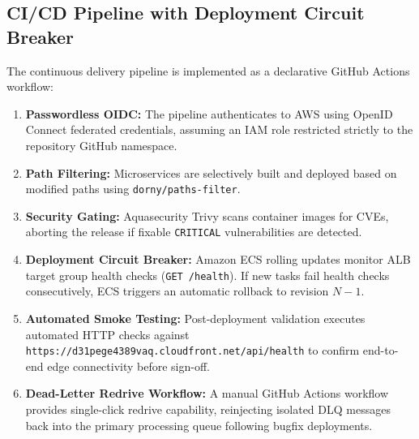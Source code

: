 \documentclass[conference]{IEEEtran}
\begin{document}
\subsection{CI/CD Pipeline with Deployment Circuit Breaker}
The continuous delivery pipeline is implemented as a declarative GitHub Actions workflow:
\begin{enumerate}
    \item \textbf{Passwordless OIDC:} The pipeline authenticates to AWS using OpenID Connect federated credentials, assuming an IAM role restricted strictly to the repository GitHub namespace.
    \item \textbf{Path Filtering:} Microservices are selectively built and deployed based on modified paths using \texttt{dorny/paths-filter}.
    \item \textbf{Security Gating:} Aquasecurity Trivy scans container images for CVEs, aborting the release if fixable \texttt{CRITICAL} vulnerabilities are detected.
    \item \textbf{Deployment Circuit Breaker:} Amazon ECS rolling updates monitor ALB target group health checks (\texttt{GET /health}). If new tasks fail health checks consecutively, ECS triggers an automatic rollback to revision $N-1$.
    \item \textbf{Automated Smoke Testing:} Post-deployment validation executes automated HTTP checks against \texttt{https://d31pege4389vaq.cloudfront.net/api/health} to confirm end-to-end edge connectivity before sign-off.
    \item \textbf{Dead-Letter Redrive Workflow:} A manual GitHub Actions workflow provides single-click redrive capability, reinjecting isolated DLQ messages back into the primary processing queue following bugfix deployments.
\end{enumerate}
\end{document}
